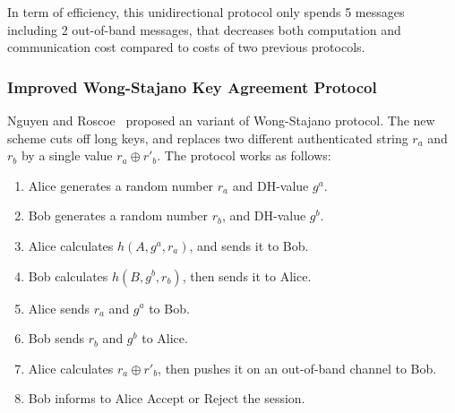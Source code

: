 In term of efficiency, this unidirectional protocol only spends 5 messages including 2 out-of-band messages, that decreases both computation and communication cost compared to costs of two previous protocols. 
\subsubsection*{Improved Wong-Stajano Key Agreement Protocol}

Nguyen and Roscoe~\cite{Nguyen09authenticationprotocols} proposed an variant of Wong-Stajano protocol. The new scheme cuts off long keys, and replaces two different authenticated string $r_a$ and $r_b$ by a single value $r_a\oplus r'_b$. The protocol works as follows:
\begin{enumerate}
\item Alice generates a random number $r_a$ and DH-value $g^a$.
\item Bob generates a random number $r_b$, and DH-value $g^b$.
\item Alice calculates $h(A,g^a,r_a)$, and sends it to Bob. 
\item Bob calculates $h(B,g^b,r_b)$, then sends it to Alice.
\item Alice sends $r_a$ and $g^a$ to Bob. 
\item Bob sends $r_b$ and $g^b$ to Alice. 
\item Alice calculates $r_a\oplus r'_b$, then pushes it on an out-of-band channel to Bob. 
\item Bob informs to Alice Accept or Reject the session.
\end{enumerate}

\begin{center}
\end{center}

